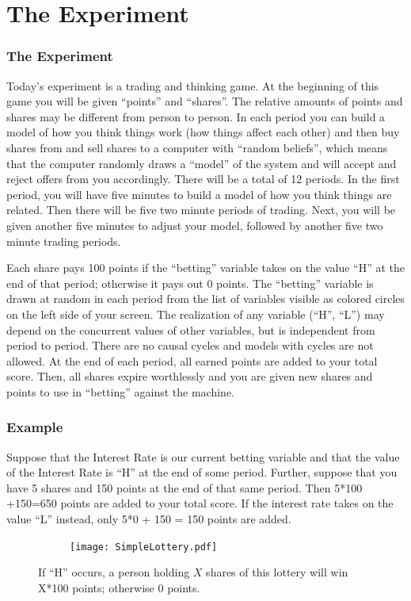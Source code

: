 \documentclass{beamer}
\begin{document}
\section{The Experiment} 
\begin{frame}
\frametitle{The Experiment}
Today's experiment is a trading and thinking game.
\hfill \break
At the beginning of this game you will be given
``points'' and ``shares''. The relative amounts of points
and shares may be different from person to person.
In each period you can build a model of how you think
things work (how things affect each other) and then
buy shares from and sell shares to a computer with ``random beliefs'', which means that the computer randomly draws a ``model'' of the system and will accept and reject offers from you accordingly.
There will be a total of 12 periods. In the first period,
you will have five minutes to build a model of how
you think things are related. Then there will be five
two minute periods of trading. Next, you will be given
another five minutes to adjust your model, followed
by another five two minute trading periods.
 
\end{frame}
\begin{frame}
Each share pays 100 points if the ``betting'' variable
takes on the value ``H'' at the end of that period;
otherwise it pays out 0 points. The ``betting'' variable is drawn at random in each period from the list of variables visible as colored circles on the left side of your screen. 
\hfill \break
The realization of any variable (``H'', ``L'') may depend on the concurrent values of other variables, but is independent from period to period. There are no causal cycles and models with cycles are not allowed. 
At the end of each period, all earned points are added to
your total score. Then, all shares expire worthlessly and you
are given new shares and points to use in ``betting'' against the machine.
\end{frame}
\begin{frame}
\frametitle{Example}
Suppose that the Interest Rate is our current betting variable and that the value of the Interest Rate is ``H'' at the end of some period. Further, suppose
that you have 5 shares and 150 points at the end of that same period. Then 5*100 +150=650 points are added to your
total score. If the interest rate takes on the value ``L''
instead, only 5*0 + 150 = 150 points are added.
\begin{figure}
        \centering
        \begin{subfigure}[b]{0.5\textwidth}
                \texttt{[image: SimpleLottery.pdf]}
                
        \end{subfigure}%
       \caption{If ``H'' occurs, a person holding $X$ shares of this lottery will win X*100 points; otherwise 0 points.}
       \label{fig:alarm}
\end{figure}
\end{frame}
\end{document}
